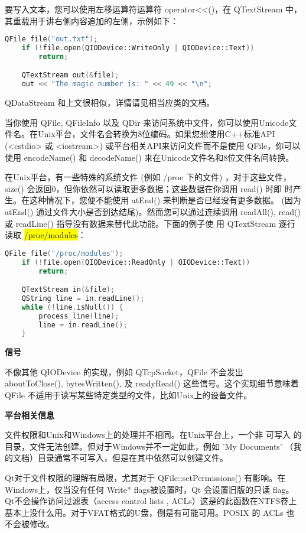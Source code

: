 要写入文本，您可以使用左移运算符运算符 operator<<()，在 QTextStream 中，
其重载用于讲右侧内容追加的左侧，示例如下：

\begin{lstlisting}[language=C++]
    QFile file("out.txt");
    if (!file.open(QIODevice::WriteOnly | QIODevice::Text))
        return;

    QTextStream out(&file);
    out << "The magic number is: " << 49 << "\n";

\end{lstlisting}

QDataStream 和上文很相似，详情请见相当应类的文档。

当你使用 QFile, QFileInfo 以及 QDir 来访问系统中文件，你可以使用Unicode文件名。在Unix平台，文件名会转换为8位编码。如果您想使用C++标准API (<cstdio> 或 <iostream>) 或平台相关API来访问文件而不是使用 QFile，你可以使用 encodeName() 和 decodeName() 来在Unicode文件名和8位文件名间转换。

在Unix平台，有一些特殊的系统文件 (例如 /proc 下的文件) ，对于这些文件，
size() 会返回0，但你依然可以读取更多数据；这些数据在你调用 read() 时即
时产生。在这种情况下，您便不能使用 atEnd() 来判断是否已经没有更多数据。
(因为 atEnd() 通过文件大小是否到达结尾)。然而您可以通过连续调用
readAll(), read() 或 readLine() 指导没有数据来替代此功能。下面的例子使
用 QTextStream 逐行读取 \hl{/proc/modules}：

\begin{lstlisting}[language=C++]
    QFile file("/proc/modules");
    if (!file.open(QIODevice::ReadOnly | QIODevice::Text))
        return;

    QTextStream in(&file);
    QString line = in.readLine();
    while (!line.isNull()) {
        process_line(line);
        line = in.readLine();
    }
\end{lstlisting}

\textbf{信号}

不像其他 QIODevice 的实现，例如 QTcpSocket，QFile 不会发出 aboutToClose(), bytesWritten(), 及 readyRead() 这些信号。这个实现细节意味着 QFile 不适用于读写某些特定类型的文件，比如Unix上的设备文件。

\textbf{平台相关信息}

文件权限和Unix和Windows上的处理并不相同。在Unix平台上，一个非 可写入 的目录，文件无法创建。但对于Windows并不一定如此，例如 'My Documents' （我的文档）目录通常不可写入，但是在其中依然可以创建文件。

Qt对于文件权限的理解有局限，尤其对于 QFile::setPermissions() 有影响。在Windows上，仅当没有任何 Write* flags被设置时，Qt 会设置旧版的只读 flag。Qt不会操作访问过滤表（access control lists , ACLs）这是的此函数在NTFS卷上基本上没什么用。对于VFAT格式的U盘，倒是有可能可用。POSIX 的 ACLs 也不会被修改。

